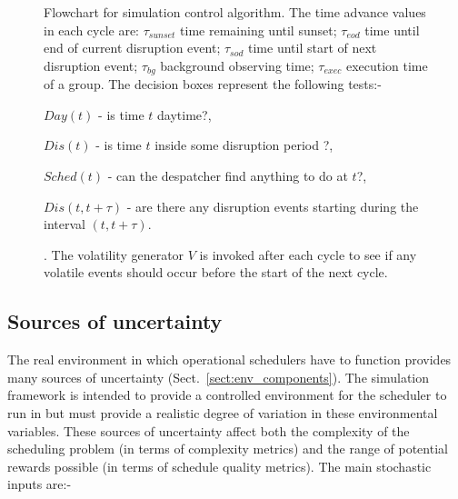 \begin{figure}[htbp]
{Flowchart for simulation control algorithm. The time advance values in each cycle are: $\tau_{sunset}$ time remaining until sunset; $\tau_{eod}$ time until end of current disruption event; $\tau_{sod}$ time until start of next disruption event; $\tau_{bg}$ background observing time; $\tau_{exec}$ execution time of a group. The decision boxes represent the following tests:- \begin{inparaenum}  \item $Day(t)$ - is time $t$ daytime?, \item $Dis(t)$ - is time $t$ inside some disruption period ?, \item $Sched(t)$ - can the despatcher find anything to do at $t$?, \item $Dis(t, t+\tau)$ - are there any disruption events starting during the interval $(t, t+\tau)$. \end{inparaenum}. The volatility generator $V$ is invoked after each cycle to see if any volatile events should occur before the start of the next cycle.}
\label{fig:ss_vgen_flowchart}
\end{figure}


\subsection{Sources of uncertainty}
\label{sect:exp_uncertainty}
The real environment in which operational schedulers have to function provides many sources of uncertainty (Sect.~\ref{sect:env_components}). The simulation framework is intended to provide a controlled environment for the scheduler to run in but must provide a realistic degree of variation in these environmental variables. These sources of uncertainty affect both the complexity of the scheduling problem (in terms of complexity metrics) and the range of potential rewards possible (in terms of schedule quality metrics). The main stochastic inputs are:-

